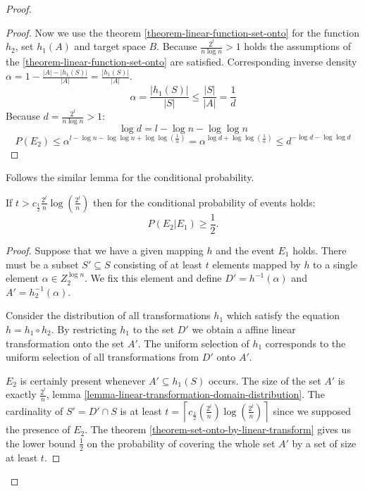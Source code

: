 \begin{proof}
\begin{proof}
Now we use the theorem \ref{theorem-linear-function-set-onto} for the function $h_2$, set $h_1(A)$ and target space $B$. Because $\frac{2^l}{n \log n} > 1$ holds the assumptions of the \ref{theorem-linear-function-set-onto} are satisfied. Corresponding inverse density $\alpha = 1 - \frac{|A| - |h_1(S)|}{|A|} = \frac{|h_1(S)|}{|A|}$.
\begin{displaymath}
\alpha = \frac{|h_1(S)|}{|S|} \leq \frac{|S|}{|A|} = \frac{1}{d}
\end{displaymath}
Because $d = \frac{2^l}{n \log n} > 1$:
\begin{displaymath}
\log d = l - \log n - \log \log n
\end{displaymath}
\begin{displaymath}
P(E_2) \leq \alpha^{l - \log n - \log \log n + \log \log \left(\frac{1}{\alpha}\right)} = \alpha ^ {\log d + \log \log \left(\frac{1}{\alpha}\right)} \leq d^{-\log d - \log \log d}
\end{displaymath}
\end{proof}

Follows the similar lemma for the conditional probability.
\begin{remark}
\label{remark-prob-t-length-chain}
If $t > c_{\frac{1}{2}}{\frac{2^l}{n}}\log\left(\frac{2^l}{n}\right)$ then for the conditional probability of events holds:
\begin{displaymath}
P(E_2 | E_1) \geq \frac{1}{2} \textit{.}
\end{displaymath}
\end{remark}
\begin{proof}
Suppose that we have a given mapping $h$ and the event $E_1$ holds. There must be a subset $S' \subseteq S$ consisting of at least $t$ elements mapped by $h$ to a single element $\alpha \in Z_2^{\log n}$. We fix this element and define $D' = h^{-1}(\alpha)$ and $A' = h_2^{-1}(\alpha)$. 

Consider the distribution of all transformations $h_1$ which satisfy the equation $h = h_1 \circ h_2$. By restricting $h_1$ to the set $D'$ we obtain a affine linear transformation onto the set $A'$. The uniform selection of $h_1$ corresponds to the uniform selection of all transformations from $D'$ onto $A'$.

$E_2$ is certainly present whenever $A' \subseteq h_1(S)$ occurs. The size of the set $A'$ is exactly $\frac{2^l}{n}$, lemma \ref{lemma-linear-transformation-domain-distribution}. The cardinality of  $S' = D' \cap S$ is at least $t = \left\lceil c_{\frac{1}{2}}\left(\frac{2^l}{n}\right)\log\left(\frac{2^l}{n}\right)\right\rceil$ since we supposed the presence of $E_2$. The theorem \ref{theorem-set-onto-by-linear-transform} gives us the lower bound $\frac{1}{2}$ on the probability of covering the whole set $A'$ by a set of size at least $t$. 
\end{proof}


\end{proof}
